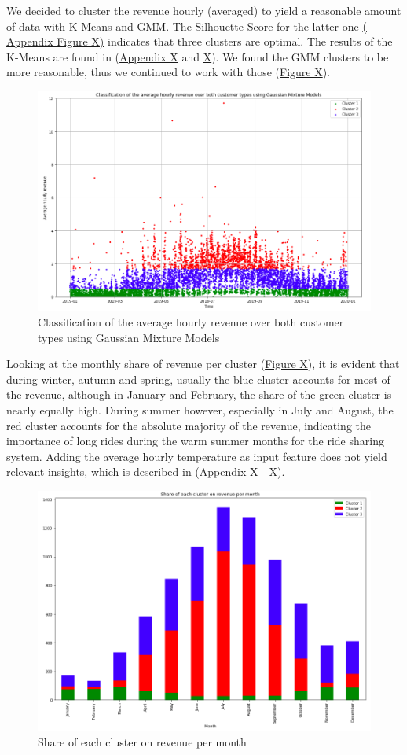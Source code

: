 We decided to cluster the revenue hourly (averaged) to yield a reasonable amount of data with K-Means and GMM. The Silhouette Score for the latter one \hyperref[BCABB1]{( Appendix Figure X)} indicates that three clusters are optimal.
The results of the K-Means are found in (\hyperref[BCAPP1]{Appendix X} and \hyperref[BCAPP2]{X}). We found the GMM clusters to be more reasonable, thus we continued to work with those (\hyperref[BCABB2]{Figure X}). 

\begin{figure}[H]
   \centering
    \includegraphics[width=0.8\linewidth]{./Figures/BC_ABB2.png}
    \caption{Classification of the average hourly revenue over both customer types using Gaussian Mixture Models}
    \label{BCABB2}
\end{figure}

Looking at the monthly share of revenue per cluster (\hyperref[BCABB3]{Figure X}), it is evident that during winter, autumn and spring, usually the blue cluster accounts for most of the revenue, although in January and February, the share of the green cluster is nearly equally high. During summer however, especially in July and August, the red cluster accounts for the absolute majority of the revenue, indicating the importance of long rides during the warm summer months for the ride sharing system. Adding the average hourly temperature as input feature does not yield relevant insights, which is described in (\hyperref[BCAPP5]{Appendix X - X}).

\begin{figure}[H]
   \centering
    \includegraphics[width=0.65\linewidth]{./Figures/BC_ABB3.png}
    \caption{Share of each cluster on revenue per month}
    \label{BCABB3}
\end{figure}

